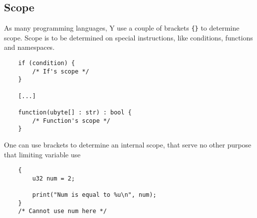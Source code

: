 \subsection{Scope}

As many programming languages, Y use a couple of brackets \texttt{\{\}}
to determine scope. Scope is to be determined on special instructions,
like conditions, functions and namespaces.

\begin{lstlisting}
    if (condition) {
        /* If's scope */
    }

    [...]

    function(ubyte[] : str) : bool {
        /* Function's scope */
    }
\end{lstlisting}

One can use brackets to determine an internal scope, that serve no
other purpose that limiting variable use

\begin{lstlisting}
    {
        u32 num = 2;

        print("Num is equal to %u\n", num);
    }
    /* Cannot use num here */
\end{lstlisting}
